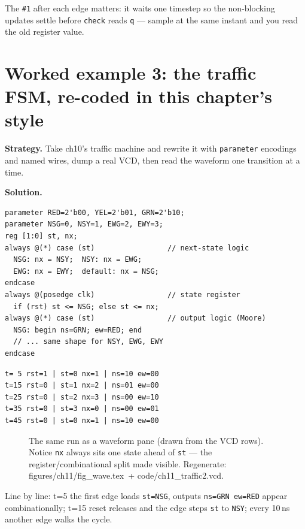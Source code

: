 The \texttt{\#1} after each edge matters: it waits one timestep so the
non-blocking updates settle before \texttt{check} reads \texttt{q} ---
sample at the same instant and you read the old register value.

\section{Worked example 3: the traffic FSM, re-coded in this chapter's
style}\label{sec:we-traffic2}

\textbf{Strategy.} Take ch10's traffic machine and rewrite it with
\texttt{parameter} encodings and named wires, dump a real VCD, then
read the waveform one transition at a time.

\textbf{Solution.}
\begin{lstlisting}[caption={\ttfamily code/ch11\_traffic2.v ---
parameters carry the encodings; the three blocks stay separate.},
label={lst:tr2}]
parameter RED=2'b00, YEL=2'b01, GRN=2'b10;
parameter NSG=0, NSY=1, EWG=2, EWY=3;
reg [1:0] st, nx;
always @(*) case (st)                 // next-state logic
  NSG: nx = NSY;  NSY: nx = EWG;
  EWG: nx = EWY;  default: nx = NSG;
endcase
always @(posedge clk)                 // state register
  if (rst) st <= NSG; else st <= nx;
always @(*) case (st)                 // output logic (Moore)
  NSG: begin ns=GRN; ew=RED; end
  // ... same shape for NSY, EWG, EWY
endcase
\end{lstlisting}

\begin{lstlisting}[caption={The real trace. Read it like the waveform:
each \texttt{st} edge also updates \texttt{nx} combinationally, so the
``next'' column always shows where the machine will land.},
abovecaptionskip=0pt]
t= 5 rst=1 | st=0 nx=1 | ns=10 ew=00
t=15 rst=0 | st=1 nx=2 | ns=01 ew=00
t=25 rst=0 | st=2 nx=3 | ns=00 ew=10
t=35 rst=0 | st=3 nx=0 | ns=00 ew=01
t=45 rst=0 | st=0 nx=1 | ns=10 ew=00
\end{lstlisting}

\begin{figure}[htbp]
\centering

\caption{The same run as a waveform pane (drawn from the VCD rows).
Notice \texttt{nx} always sits one state ahead of \texttt{st} --- the
register/combinational split made visible. Regenerate:
\ttfamily figures/ch11/fig\_wave.tex\ + code/ch11\_traffic2.vcd.}
\label{fig:wave}
\end{figure}

Line by line: t=5 the first edge loads \texttt{st=NSG}, outputs
\texttt{ns=GRN ew=RED} appear combinationally; t=15 reset releases and
the edge steps \texttt{st} to \texttt{NSY}; every 10\,ns another edge
walks the cycle.


